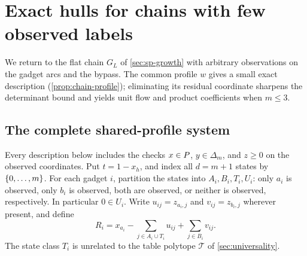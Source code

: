 \section{Exact hulls for chains with few observed labels}\label{sec:fixed-chains}

We return to the flat chain $G_L$ of \cref{sec:sp-growth} with arbitrary
observations on the gadget arcs and the bypass. The common profile $w$
gives a small exact description (\cref{prop:chain-profile}); eliminating its
residual coordinate sharpens the determinant bound and yields unit flow and
product coefficients when $m\le3$.

\subsection{The complete shared-profile system}

Every description below includes the checks $x\in P$,
$y\in\Delta_m$, and $z\ge0$ on the observed coordinates. Put $t=1-x_h$, and index all $d=m+1$ states by $\{0,\ldots,m\}$.
For each gadget $i$, partition the states into $A_i,B_i,T_i,U_i$:
only $a_i$ is observed, only $b_i$ is observed, both are observed,
or neither is observed, respectively. In particular $0\in U_i$.
Write $u_{ij}=z_{a_i,j}$ and $v_{ij}=z_{b_i,j}$ wherever present,
and define
\begin{equation}\label{eq:chain-R}
 R_i=x_{a_i}-\sum_{j\in A_i\cup T_i}u_{ij}
                  +\sum_{j\in B_i}v_{ij}.
\end{equation}
The state class $T_i$ is unrelated to the table polytope $\mathcal T$
of \cref{sec:universality}.

